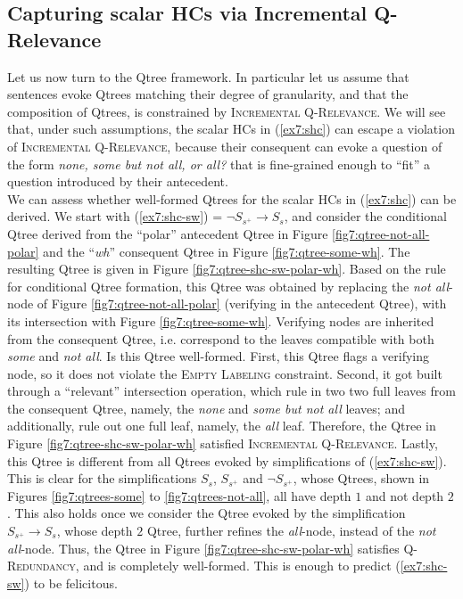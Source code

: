 \subsection{Capturing scalar HCs via Incremental Q-Relevance}

Let us now turn to the Qtree framework. In particular let us assume that sentences evoke Qtrees matching their degree of granularity, and that the composition of Qtrees, is constrained by \textsc{Incremental Q-Relevance}. We will see that, under such assumptions, the scalar HCs in (\ref{ex7:shc}) can escape a violation of \textsc{Incremental Q-Relevance}, because their consequent can evoke a question of the form \textit{none, some but not all, or all?} that is fine-grained enough to ``fit'' a question introduced by their antecedent.\\



We can assess whether well-formed Qtrees for the scalar HCs in (\ref{ex7:shc}) can be derived. We start with (\ref{ex7:shc-sw}) = $\neg S_{s^+} \rightarrow S_s$, and consider the conditional Qtree derived from the ``polar'' antecedent Qtree in Figure \ref{fig7:qtree-not-all-polar} and the ``\textit{wh}'' consequent Qtree in Figure \ref{fig7:qtree-some-wh}. The resulting Qtree is given in Figure \ref{fig7:qtree-shc-sw-polar-wh}. Based on the rule for conditional Qtree formation, this Qtree was obtained by replacing the \textit{not all}-node of Figure \ref{fig7:qtree-not-all-polar} (verifying in the antecedent Qtree), with its intersection with Figure  \ref{fig7:qtree-some-wh}. Verifying nodes are inherited from the consequent Qtree, i.e. correspond to the leaves compatible with both \textit{some} and \textit{not all}. Is this Qtree well-formed. First, this Qtree flags a verifying node, so it does not violate the \textsc{Empty Labeling} constraint. Second, it got built through a ``relevant'' intersection operation, which rule in two two full leaves from the consequent Qtree, namely, the \textit{none} and \textit{some but not all} leaves; and additionally, rule out one full leaf, namely, the \textit{all} leaf. Therefore, the Qtree in Figure \ref{fig7:qtree-shc-sw-polar-wh} satisfied \textsc{Incremental Q-Relevance}. Lastly, this Qtree is different from all Qtrees evoked by simplifications of (\ref{ex7:shc-sw}). This is clear for the simplifications $S_s$, $S_{s^+}$ and $\neg S_{s^+}$, whose Qtrees, shown in Figures \ref{fig7:qtrees-some} to \ref{fig7:qtrees-not-all}, all have depth $1$ and not depth $2$. This also holds once we consider the Qtree evoked by the simplification $S_{s^+} \rightarrow S_s$, whose depth $2$ Qtree, further refines the \textit{all}-node, instead of the \textit{not all}-node. Thus, the Qtree in Figure \ref{fig7:qtree-shc-sw-polar-wh} satisfies \textsc{Q-Redundancy}, and is completely well-formed. This is enough to predict  (\ref{ex7:shc-sw}) to be felicitous.
 
